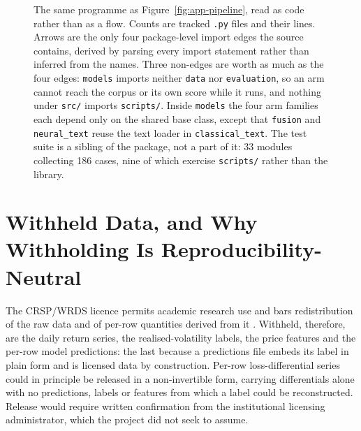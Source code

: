 \begin{figure}[tbp]
  \caption[The library, component by component]{The same programme as
  Figure~\ref{fig:app-pipeline}, read as code rather than as a flow. Counts are
  tracked \texttt{.py} files and their lines. Arrows are the only four
  package-level import edges the source contains, derived by parsing every
  import statement rather than inferred from the names. Three non-edges are
  worth as much as the four edges: \texttt{models} imports neither
  \texttt{data} nor \texttt{evaluation}, so an arm cannot reach the corpus or
  its own score while it runs, and nothing under \texttt{src/} imports
  \texttt{scripts/}. Inside \texttt{models} the four arm families each depend
  only on the shared base class, except that \texttt{fusion} and
  \texttt{neural\_text} reuse the text loader in \texttt{classical\_text}. The
  test suite is a sibling of the package, not a part of it: 33 modules
  collecting 186 cases, nine of which exercise \texttt{scripts/} rather than
  the library.} %
  \label{fig:app-components}
\end{figure}

\FloatBarrier
\section{Withheld Data, and Why Withholding Is Reproducibility-Neutral}
\label{app:external:withheld}

The CRSP/WRDS licence permits academic research use and bars redistribution of
the raw data and of per-row quantities derived from it \cite{crsp2026data}.
Withheld, therefore, are the daily return series, the realised-volatility labels,
the price features and the per-row model predictions: the last because a
predictions file embeds its label in plain form and is licensed data by
construction. Per-row loss-differential series could in principle be released in
a non-invertible form, carrying differentials alone with no predictions, labels
or features from which a label could be reconstructed. Release would require
written confirmation from the institutional licensing administrator, which the
project did not seek to assume.


